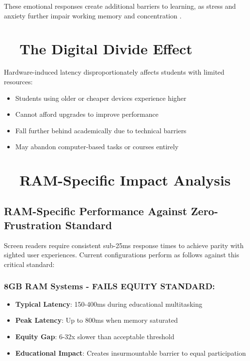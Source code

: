 These emotional responses create additional barriers to learning, as stress and anxiety further impair working memory and concentration \supercite{Eysenck2007AnxietyAndCognition}.

\section{~~The Digital Divide Effect}\label{the-digital-divide-effect}

Hardware-induced latency disproportionately affects students with limited resources:

\begin{itemize}
	\item Students using older or cheaper devices experience higher  \supercite{Attewell2001TheDigitalDivide}
	\item Cannot afford  upgrades to improve performance \supercite{Warschauer2003TechnologyAndSocialInclusion}
	\item Fall further behind academically due to technical barriers \supercite{DiMaggio2001FromUnequalAccess}
	\item May abandon computer-based tasks or courses entirely \supercite{Compaine2001TheDigitalDivide}
\end{itemize}

\section{~~RAM-Specific Impact Analysis}\label{ram-specific-impact-analysis}

\subsection{RAM-Specific Performance Against Zero-Frustration Standard}\label{ram-specific-performance-against-zero-frustration-standard}

Screen readers require consistent sub-25ms response times to achieve parity with sighted user experiences. Current  configurations perform as follows against this critical standard:

\subsubsection{8GB RAM Systems - FAILS EQUITY STANDARD:}

\begin{itemize}
	\item \textbf{Typical Latency}: 150-400ms during educational multitasking
	\item \textbf{Peak Latency}: Up to 800ms when memory saturated
	\item \textbf{Equity Gap}: 6-32x slower than acceptable threshold \supercite{EquityAnalysisRevision}
	\item \textbf{Educational Impact}: Creates insurmountable barrier to equal participation \supercite{EducationalEquityReport2024}
\end{itemize}



